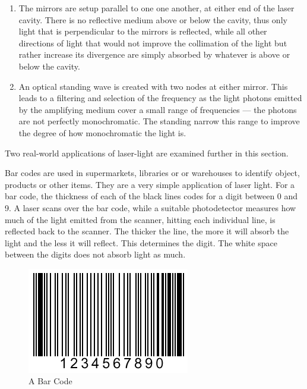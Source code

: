 \begin{enumerate}
	
	\item The mirrors are setup parallel to one one another, at either end of the laser cavity. There is no reflective medium above or below the cavity, thus only light that is perpendicular to the mirrors is reflected, while all other directions of light that would not improve the collimation of the light but rather increase its divergence are simply absorbed by whatever is above or below the cavity.

	\item An optical standing wave is created with two nodes at either mirror. This leads to a filtering and selection of the frequency as the light photons emitted by the amplifying medium cover a small range of frequencies --- the photons are not perfectly monochromatic. The standing narrow this range to improve the degree of how monochromatic the light is.

\end{enumerate}


Two real-world applications of laser-light are examined further in this section.


Bar codes are used in supermarkets, libraries or or warehouses to identify object, products or other items. They are a very simple application of laser light. For a bar code, the thickness of each of the black lines codes for a digit between 0 and 9. A laser scans over the bar code, while a suitable photodetector measures how much of the light emitted from the scanner, hitting each individual line, is reflected back to the scanner. The thicker the line, the more it will absorb the light and the less it will reflect. This determines the digit. The white space between the digits does not absorb light as much.

\begin{figure}[h!]
	\centering
	\includegraphics[scale=0.8]{img/bar}
	\caption*{A Bar Code}
\end{figure}

